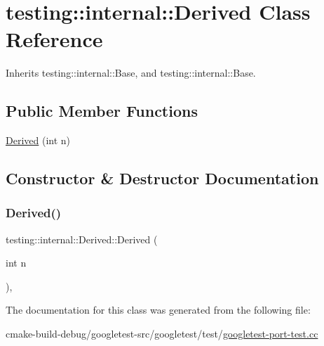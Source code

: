 \hypertarget{classtesting_1_1internal_1_1Derived}{}\section{testing\+::internal\+::Derived Class Reference}
\label{classtesting_1_1internal_1_1Derived}


Inherits testing\+::internal\+::\+Base, and testing\+::internal\+::\+Base.

\subsection*{Public Member Functions}
\begin{DoxyCompactItemize}
\item 
\mbox{\hyperlink{classtesting_1_1internal_1_1Derived_a05a8e8354c7c09a9f3728a96c96f1edd}{Derived}} (int n)
\end{DoxyCompactItemize}


\subsection{Constructor \& Destructor Documentation}
\mbox{\label{classtesting_1_1internal_1_1Derived_a05a8e8354c7c09a9f3728a96c96f1edd}} 
\subsubsection{\texorpdfstring{Derived()}{Derived()}}
{\footnotesize\ttfamily testing\+::internal\+::\+Derived\+::\+Derived (\begin{DoxyParamCaption}\item[{int}]{n }\end{DoxyParamCaption})\hspace{0.3cm}{\ttfamily [inline]}, {\ttfamily [explicit]}}



The documentation for this class was generated from the following file\+:\begin{DoxyCompactItemize}
\item 
cmake-\/build-\/debug/googletest-\/src/googletest/test/\mbox{\hyperlink{googletest-port-test_8cc}{googletest-\/port-\/test.\+cc}}\end{DoxyCompactItemize}
